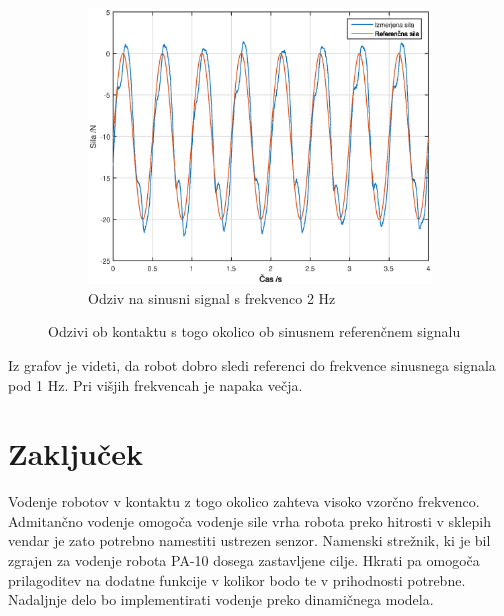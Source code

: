 \documentclass[a4paper]{article}
\begin{document}
\begin{figure}[!ht]
	\begin{subfigure}[b]{0.4\textwidth}
		\includegraphics[width=\textwidth]{./slike/figure_20_hz.eps}
		\caption{Odziv na sinusni signal s frekvenco 2 Hz}
	\end{subfigure}
	
	\caption{Odzivi ob kontaktu s togo okolico ob sinusnem referenčnem signalu}
	\label{fig:sineref}
\end{figure}

Iz grafov je videti, da robot dobro sledi referenci do frekvence sinusnega signala pod 1 Hz. Pri višjih frekvencah je napaka večja.

\section{Zaključek}

Vodenje robotov v kontaktu z togo okolico zahteva visoko vzorčno frekvenco. Admitančno vodenje omogoča vodenje sile vrha robota preko hitrosti v sklepih vendar je zato potrebno namestiti ustrezen senzor. Namenski strežnik, ki je bil zgrajen za vodenje robota PA-10 dosega zastavljene cilje. Hkrati pa omogoča prilagoditev na dodatne funkcije v kolikor bodo te v prihodnosti potrebne. Nadaljnje delo bo implementirati vodenje preko dinamičnega modela. 

\small



%
%
%
%

	
\end{document}
